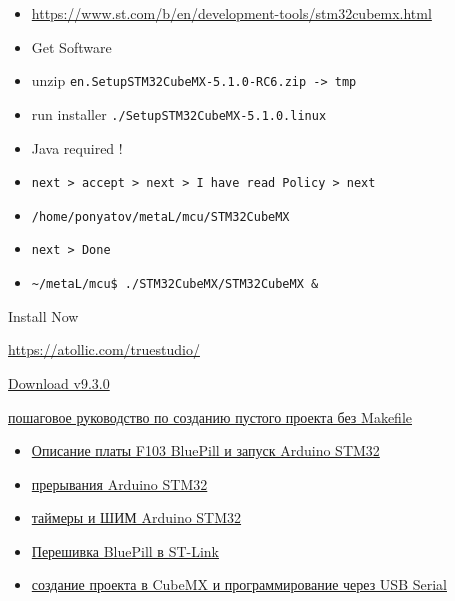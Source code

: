 
\begin{itemize}
  \item 
\url{https://www.st.com/b/en/development-tools/stm32cubemx.html}
  \item
Get Software
\item
unzip \verb|en.SetupSTM32CubeMX-5.1.0-RC6.zip -> tmp|
\item
run installer \verb|./SetupSTM32CubeMX-5.1.0.linux|
\item 
Java required !
\item
\verb|next > accept > next > I have read Policy > next|
\item 
\verb|/home/ponyatov/metaL/mcu/STM32CubeMX|
\item 
\verb|next > Done|
\item 
\verb|~/metaL/mcu$ ./STM32CubeMX/STM32CubeMX &|
\end{itemize}



 Install Now


\url{https://atollic.com/truestudio/}

\href{http://download.atollic.com/TrueSTUDIO/installers/Atollic_TrueSTUDIO_for_STM32_linux_x86_64_v9.3.0_20190212-0734.tar.gz}{Download v9.3.0}

\href{http://easyelectronics.ru/cozdanie-minimalnogo-proekta-pod-stm32-v-atollic-true-studio.html}{пошаговое руководство по созданию пустого проекта без Makefile}

\begin{itemize}
\item
\href{https://istarik.ru/blog/arduino/102.html}{Описание платы F103 BluePill и запуск Arduino STM32}
\item
\href{https://istarik.ru/blog/arduino/104.html}{прерывания Arduino STM32}
\item
\href{https://istarik.ru/blog/arduino/105.html}{таймеры и ШИМ Arduino STM32}
\item
\href{https://istarik.ru/blog/stm32/107.html}{Перешивка BluePill в ST-Link}
\item
\href{https://istarik.ru/blog/stm32/106.html}{создание проекта в CubeMX и программирование через USB Serial}
\end{itemize}

